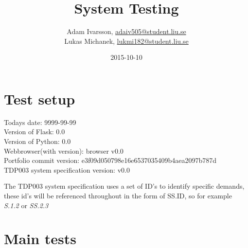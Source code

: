 \documentclass{TDP003mall}
\author{Adam Ivarsson, \url{adaiv505@student.liu.se}\\
  Lukas Michanek, \url{lukmi182@student.liu.se}}
\title{System Testing}
\date{2015-10-10}
\begin{document}
\projectpage

\section{Test setup}\label{test-setup}

Todays date: 9999-99-99\\
Version of Flask: 0.0\\
Version of Python: 0.0\\
Webbrowser(with version): browser v0.0\\
Portfolio commit version: e3f09d050798e16e6537035409b4aea2097b787d\\
TDP003 system specification version: v0.0


The TDP003 system specification uses a set of ID's to identify specific demands, these id's will be referenced throughout in the form of SS.ID, so for example \textit{S.1.2} or \textit{SS.2.3}


\section{Main tests}\label{main-tests}
\end{document}
